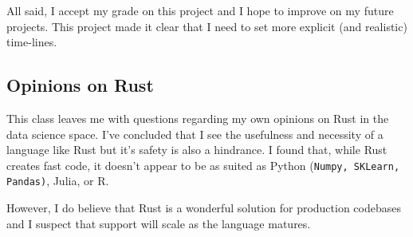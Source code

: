 \documentclass[12pt,letterpaper]{article}
\begin{document}
All said, I accept my grade on this project and I hope to improve on my future projects. This project made it clear that I need to set more explicit (and realistic) time-lines. 

\subsection{Opinions on Rust}
This class leaves me with questions regarding my own opinions on Rust in the data science space. I've concluded that I see the usefulness and necessity of a language like Rust but it's safety is also a hindrance.  I found that, while Rust creates fast code, it doesn't appear to be as suited as Python (\texttt{Numpy, SKLearn, Pandas)}, Julia, or R.  

However, I do believe that Rust is a wonderful solution for production codebases and I suspect that support will scale as the language matures. 
\end{document}
